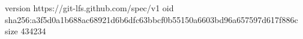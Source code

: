 version https://git-lfs.github.com/spec/v1
oid sha256:a3f5d0a1b688ac68921d6b6dfc63bbcf0b55150a6603bd96a657597d617f886c
size 434234
